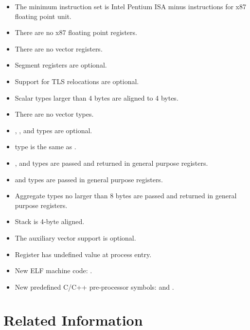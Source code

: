 \begin{itemize}
  \item The minimum instruction set is Intel Pentium ISA minus
	instructions for x87 floating point unit.
  \item There are no x87 floating point registers.
  \item There are no vector registers.
  \item Segment registers are optional.
  \item Support for TLS relocations are optional.
  \item Scalar types larger than 4 bytes are aligned to 4 bytes.
  \item There are no vector types.
  \item {}, , and 
	types are optional.
  \item {} type is the same as .
  \item {},  and  types are
	passed and returned in general purpose registers.
  \item {} and  types are passed
	in general purpose registers.
  \item Aggregate types no larger than 8 bytes are passed and returned
	in general purpose registers.
  \item Stack is 4-byte aligned.
  \item The auxiliary vector support is optional.
  \item Register \EDX has undefined value at process entry.
  \item New ELF machine code: .
  \item New predefined C/C++ pre-processor symbols:  and
	.
\end{itemize}


\section{Related Information}


